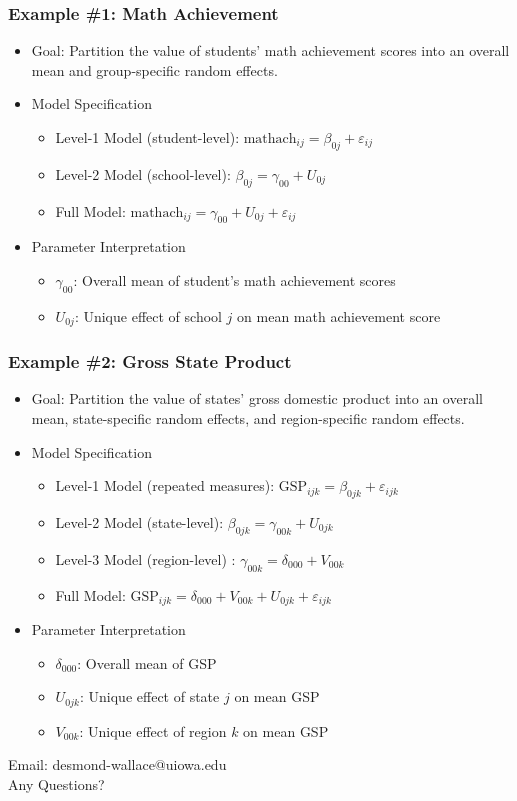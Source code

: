 \documentclass{beamer}
\begin{document}
\begin{frame}
	\frametitle{Example \#1: Math Achievement}
		\begin{itemize}
			\item Goal: Partition the value of students' math achievement scores into an overall mean and group-specific random effects.
			\item Model Specification
				\begin{itemize}
					\item Level-1 Model (student-level): $\mbox{mathach}_{ij}=\beta_{0j}+\varepsilon_{ij}$
					\item Level-2 Model (school-level): $\beta_{0j}=\gamma_{00}+U_{0j}$
					\item Full Model: $\mbox{mathach}_{ij}=\gamma_{00}+U_{0j}+\varepsilon_{ij}$
				\end{itemize}
			\item Parameter Interpretation
				\begin{itemize}
					\item $\gamma_{00}$: Overall mean of student's math achievement scores
					\item $U_{0j}$: Unique effect of school $j$ on mean math achievement score
				\end{itemize}
		\end{itemize}
\end{frame}

\begin{frame}
	\frametitle{Example \#2: Gross State Product}
		\begin{itemize}
			\item Goal: Partition the value of states' gross domestic product into an overall mean, state-specific random effects, and region-specific random effects.
			\item Model Specification
				\begin{itemize}
					\item Level-1 Model (repeated measures): $\mbox{GSP}_{ijk}=\beta_{0jk}+\varepsilon_{ijk}$
					\item Level-2 Model (state-level): $\beta_{0jk}=\gamma_{00k}+U_{0jk}$
					\item Level-3 Model (region-level) :
					$\gamma_{00k}=\delta_{000}+V_{00k}$
					\item Full Model: $\mbox{GSP}_{ijk}=\delta_{000}+V_{00k}+U_{0jk}+\varepsilon_{ijk}$
				\end{itemize}
			\item Parameter Interpretation
				\begin{itemize}
					\item $\delta_{000}$: Overall mean of GSP
					\item $U_{0jk}$: Unique effect of state $j$ on mean GSP
					\item $V_{00k}$: Unique effect of region $k$ on mean GSP
				\end{itemize}
		\end{itemize}
\end{frame}

\begin{frame}
	\begin{center}
		\begin{LARGE}
			Email: desmond-wallace@uiowa.edu\\
			Any Questions?
		\end{LARGE}
	\end{center}
\end{frame}
\end{document}
